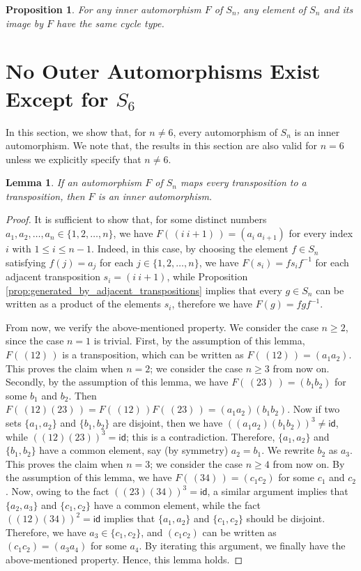 \documentclass[11pt]{article}
\newtheorem{proposition}{Proposition}
\newtheorem{lemma}{Lemma}
\begin{document}
\begin{proposition}
\label{prop:type_and_inner_automorphism}
For any inner automorphism $F$ of $S_n$, any element of $S_n$ and its image by $F$ have the same cycle type.
\end{proposition}


\section{No Outer Automorphisms Exist Except for $S_6$}

In this section, we show that, for $n \neq 6$, every automorphism of $S_n$ is an inner automorphism.
We note that, the results in this section are also valid for $n = 6$ unless we explicitly specify that $n \neq 6$.

\begin{lemma}
\label{lem:inner_automorphism_from_type}
If an automorphism $F$ of $S_n$ maps every transposition to a transposition, then $F$ is an inner automorphism.
\end{lemma}
\begin{proof}
It is sufficient to show that, for some distinct numbers $a_1,a_2,\dots,a_n \in \{1,2,\dots,n\}$, we have $F(\,(i\ i+1)\,) = (a_i\ a_{i+1})$ for every index $i$ with $1 \leq i \leq n-1$.
Indeed, in this case, by choosing the element $f \in S_n$ satisfying $f(j) = a_j$ for each $j \in \{1,2,\dots,n\}$, we have $F(s_i) = f s_i f^{-1}$ for each adjacent transposition $s_i = (i\ i+1)$, while Proposition \ref{prop:generated_by_adjacent_transpositions} implies that every $g \in S_n$ can be written as a product of the elements $s_i$, therefore we have $F(g) = f g f^{-1}$.

From now, we verify the above-mentioned property.
We consider the case $n \geq 2$, since the case $n = 1$ is trivial.
First, by the assumption of this lemma, $F(\,(12)\,)$ is a transposition, which can be written as $F(\,(12)\,) = (a_1 a_2)$.
This proves the claim when $n = 2$; we consider the case $n \geq 3$ from now on.
Secondly, by the assumption of this lemma, we have $F(\,(23)\,) = (b_1 b_2)$ for some $b_1$ and $b_2$.
Then $F(\,(12)(23)\,) = F(\,(12)\,)F(\,(23)\,) = (a_1a_2)(b_1b_2)$.
Now if two sets $\{a_1,a_2\}$ and $\{b_1,b_2\}$ are disjoint, then we have $((a_1a_2)(b_1b_2))^3 \neq \mathsf{id}$, while $((12)(23))^3 = \mathsf{id}$; this is a contradiction.
Therefore, $\{a_1,a_2\}$ and $\{b_1,b_2\}$ have a common element, say (by symmetry) $a_2 = b_1$.
We rewrite $b_2$ as $a_3$.
This proves the claim when $n = 3$; we consider the case $n \geq 4$ from now on.
By the assumption of this lemma, we have $F(\,(34)\,) = (c_1 c_2)$ for some $c_1$ and $c_2$.
Now, owing to the fact $((23)(34))^3 = \mathsf{id}$, a similar argument implies that $\{a_2,a_3\}$ and $\{c_1,c_2\}$ have a common element, while the fact $((12)(34))^2 = \mathsf{id}$ implies that $\{a_1,a_2\}$ and $\{c_1,c_2\}$ should be disjoint.
Therefore, we have $a_3 \in \{c_1,c_2\}$, and $(c_1c_2)$ can be written as $(c_1c_2) = (a_3a_4)$ for some $a_4$.
By iterating this argument, we finally have the above-mentioned property.
Hence, this lemma holds.
\end{proof}
\end{document}
